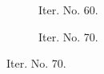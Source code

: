 \documentclass[a4paper,12pt]{amsart}
\numberwithin{equation}{section}
\begin{document}
\begin{figure}[h!]
\centering
\begin{subfigure}[t]{0.49\textwidth}
    \caption{Iter. No. 60.}
\end{subfigure}
	\hfill
\begin{subfigure}[t]{0.49\textwidth}
    \caption{Iter. No. 70.}
\end{subfigure}


\end{figure}
\end{document}

